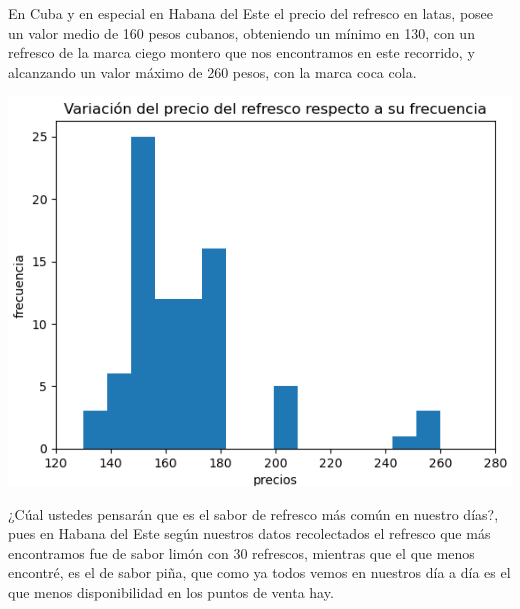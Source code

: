 \documentclass[a4paper,11pt]{article}
\begin{document}
\par\vspace{2pt}
En Cuba y en especial en Habana del Este el precio del refresco en latas, posee un valor medio de 160 pesos cubanos, obteniendo un mínimo en 130, con un refresco de la marca ciego montero que nos encontramos en este recorrido, y alcanzando un valor máximo de 260 pesos, con la marca coca cola.
\par\vspace{2pt}
\begin{minipage}{0.5\textwidth}
  \begin{center}
    \includegraphics[width=1.4\textwidth]{precio de refresco.png}
  \end{center}
\end{minipage}
\par\vspace{2pt}
¿Cúal ustedes pensarán que es el sabor de refresco más común en nuestro días?, pues en Habana del Este según nuestros datos recolectados el refresco que más encontramos fue de sabor limón con 30 refrescos, mientras que el que menos encontré, es el de sabor piña, que como ya todos vemos en nuestros día a día es el que menos disponibilidad en los puntos de venta hay.
\par\vspace{2pt}
\end{document}
